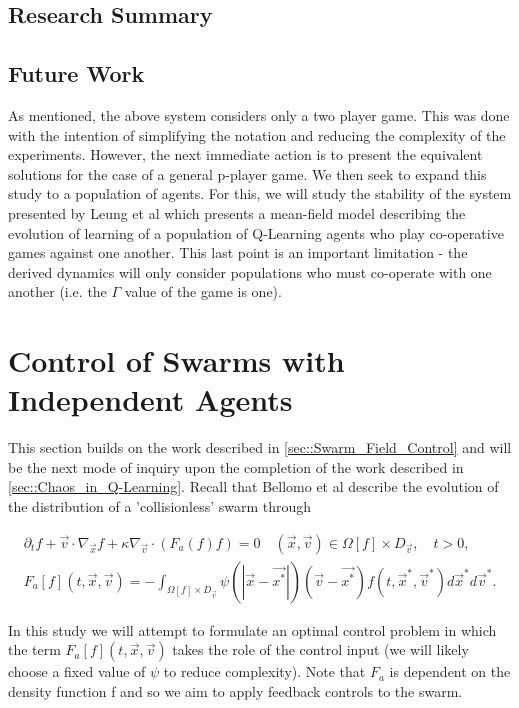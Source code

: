 \documentclass[.../main.tex]{subfiles}
\begin{document}
    \subsection{Research Summary} %
    
    \subsection*{Future Work} \label{sec::Future Work}

    As mentioned, the above system considers only a two player game. This was done with the intention
    of simplifying the notation and reducing the complexity of the experiments. However, the next
    immediate action is to present the equivalent solutions for the case of a general p-player game.
    We then seek to expand this study to a population of agents. For this, we will study the
    stability of the system presented by Leung et al \cite{Leung} which presents a mean-field model
    describing the evolution of learning of a population of Q-Learning agents who play co-operative
    games against one another. This last point is an important limitation - the derived dynamics
    will only consider populations who must co-operate with one another (i.e. the $\Gamma$ value of
    the game is one). 

    \section{Control of Swarms with Independent Agents} \label{sec::Independent_Swarm_Control}
    
    This section builds on the work described in \ref{sec::Swarm_Field_Control} and will be the next
    mode of inquiry upon the completion of the work described in \ref{sec::Chaos_in_Q-Learning}.
    Recall that Bellomo et al describe the evolution of the distribution of a 'collisionless' swarm
    through

    \begin{equation}
    \begin{align*}    
        \partial_t f + \Vec{v} \cdot \nabla_{\Vec{x}} f + \kappa \nabla_{\Vec{v}} \cdot (F_a (f) f)
        = 0 \quad  (\Vec{x}, \Vec{v}) \in \Omega[f] \times D_{\Vec{v}}, \quad t>0, \\
        F_a[f](t, \Vec{x}, \Vec{v}) = - \int_{\Omega [f] \times D_{\Vec{v}}} \psi (|\Vec{x} - \Vec
        {x^*}|)(\Vec{v} - \Vec{x^*}) f(t, \Vec{x}^*, \Vec{v}^*) d\Vec{x}^* d\Vec{v}^*.
    \end{align*}
    \end{equation}


    In this study we will attempt to formulate an optimal control problem in which the term $F_a[f]
    (t, \Vec{x}, \Vec{v})$ takes the role of the control input (we will likely choose a fixed value
    of $\psi$ to reduce complexity). Note that $F_a$ is dependent on the density function f and so
    we aim to apply feedback controls to the swarm. 
\end{document}
